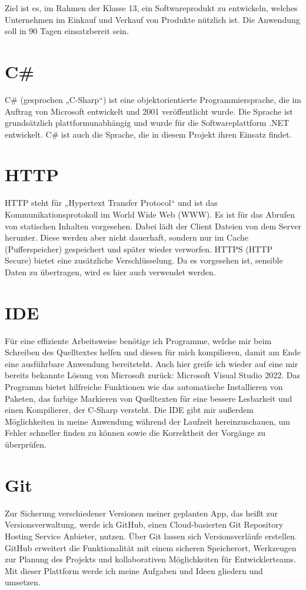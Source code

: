 Ziel ist es, im Rahmen der Klasse 13, ein Softwareprodukt zu entwickeln, welches Unternehmen im Einkauf und Verkauf von Produkte nützlich ist. Die Anwendung soll in 90 Tagen einsatzbereit sein.

\section{C\#}
C\# (gesprochen „C-Sharp“) ist eine objektorientierte Programmiersprache, die im Auftrag von Microsoft entwickelt und 2001 veröffentlicht wurde. Die Sprache ist grundsätzlich plattformunabhängig und wurde für die Softwareplattform .NET entwickelt. C\# ist auch die Sprache, die in diesem Projekt ihren Einsatz findet.

\section{HTTP}
HTTP steht für „Hypertext Transfer Protocol“ und ist das Kommunikationsprotokoll im World Wide Web (WWW). Es ist für das Abrufen von statischen Inhalten vorgesehen. Dabei lädt der Client Dateien von dem Server herunter. Diese werden aber nicht dauerhaft, sondern nur im Cache (Pufferspeicher) gespeichert und später wieder verworfen. HTTPS (HTTP Secure) bietet eine zusätzliche Verschlüsselung. Da es vorgesehen ist, sensible Daten zu übertragen, wird es hier auch verwendet werden.

\section{IDE}
Für eine effiziente Arbeitsweise benötige ich Programme, welche mir beim Schreiben des Quelltextes helfen und diesen für mich kompilieren, damit am Ende eine ausführbare Anwendung bereitsteht. Auch hier greife ich wieder auf eine mir bereits bekannte Lösung von Microsoft zurück: Microsoft Visual Studio 2022. Das Programm bietet hilfreiche Funktionen wie das automatische Installieren von Paketen, das farbige Markieren von Quelltexten für eine bessere Lesbarkeit und einen Kompilierer, der C-Sharp versteht. Die IDE gibt mir außerdem Möglichkeiten in meine Anwendung während der Laufzeit hereinzuschauen, um Fehler schneller finden zu können sowie die Korrektheit der Vorgänge zu überprüfen.

\section{Git}
Zur Sicherung verschiedener Versionen meiner geplanten App, das heißt zur Versionsverwaltung, werde ich GitHub, einen Cloud-basierten Git Repository Hosting Service Anbieter, nutzen. Über Git lassen sich Versionsverläufe erstellen. GitHub erweitert die Funktionalität mit einem sicheren Speicherort, Werkzeugen zur Planung des Projekts und kollaborativen Möglichkeiten für Entwicklerteams. Mit dieser Plattform werde ich meine Aufgaben und Ideen gliedern und umsetzen.

